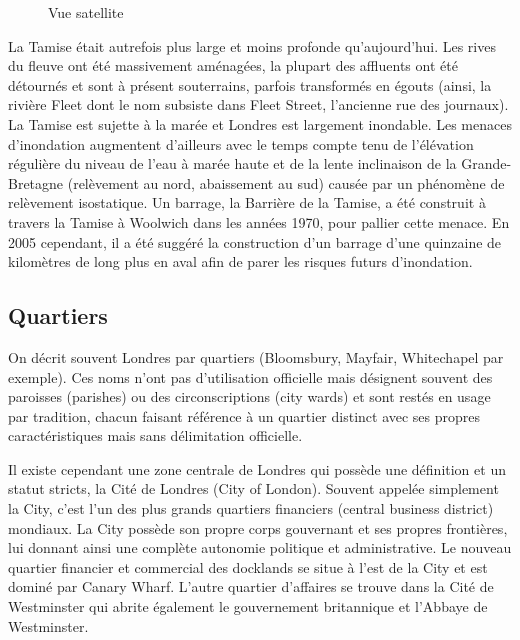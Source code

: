 \documentclass{article}
\begin{document}
\begin{figure}
\centering
{}
\caption{Vue satellite}
\label{fig:geo2}
\end{figure}
La Tamise était autrefois plus large et moins profonde qu'aujourd'hui. Les rives du fleuve ont été massivement aménagées, la plupart des affluents ont été détournés et sont à présent souterrains, parfois transformés en égouts (ainsi, la rivière Fleet dont le nom subsiste dans Fleet Street, l'ancienne rue des journaux). La Tamise est sujette à la marée et Londres est largement inondable. Les menaces d'inondation augmentent d'ailleurs avec le temps compte tenu de l'élévation régulière du niveau de l'eau à marée haute et de la lente inclinaison de la Grande-Bretagne (relèvement au nord, abaissement au sud) causée par un phénomène de relèvement isostatique. Un barrage, la Barrière de la Tamise, a été construit à travers la Tamise à Woolwich dans les années 1970, pour pallier cette menace. En 2005 cependant, il a été suggéré la construction d'un barrage d'une quinzaine de kilomètres de long plus en aval afin de parer les risques futurs d'inondation.

\subsection{Quartiers}
On décrit souvent Londres par quartiers (Bloomsbury, Mayfair, Whitechapel par exemple). Ces noms n'ont pas d'utilisation officielle mais désignent souvent des paroisses (parishes) ou des circonscriptions (city wards) et sont restés en usage par tradition, chacun faisant référence à un quartier distinct avec ses propres caractéristiques mais sans délimitation officielle.

Il existe cependant une zone centrale de Londres qui possède une définition et un statut stricts, la Cité de Londres (City of London). Souvent appelée simplement la City, c'est l'un des plus grands quartiers financiers (central business district) mondiaux. La City possède son propre corps gouvernant et ses propres frontières, lui donnant ainsi une complète autonomie politique et administrative. Le nouveau quartier financier et commercial des docklands se situe à l'est de la City et est dominé par Canary Wharf. L'autre quartier d'affaires se trouve dans la Cité de Westminster qui abrite également le gouvernement britannique et l'Abbaye de Westminster.
\end{document}
